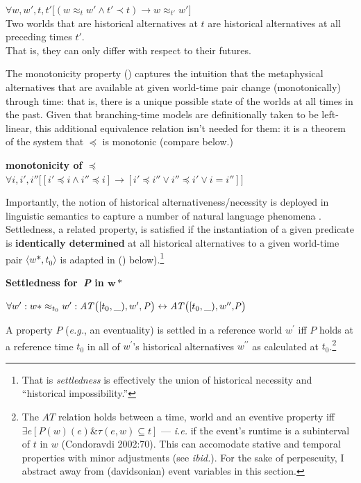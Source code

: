 \documentclass[12pt,dvipsnames]{report}
\begin{document}
	 $ \forall w,w',t,t'\big[(w\approx_t w'\wedge t'\prec t)\to w\approx_{t'} w'\big]$\\
	Two worlds that are historical alternatives at $t$ are historical alternatives at all preceding times $t'$.\\That is, they can only differ with respect to their futures.
	\xe

The monotonicity property () captures the intuition that the metaphysical alternatives that are available at given world-time pair change (monotonically) through time: that is, there is a unique possible state of the worlds at all times in the past.  Given that branching-time models are definitionally taken to be left-linear, this additional equivalence relation isn't needed for them: it is a theorem of the system that $ \preccurlyeq $ is monotonic (compare  below.)

\pex[exno=\getref{histaltdef}]
\a[label=b′] \textbf{monotonicity of $ \boldsymbol\preccurlyeq $}\\$ \forall i,i',i''\big[[i'\preccurlyeq i\wedge i''\preccurlyeq i]\to [i'\preccurlyeq i'' \vee i'' \preccurlyeq i' \vee i=i'']\big] $
\xe


Importantly, the notion of historical alternativeness/necessity is deployed in linguistic semantics to capture a number of natural language phenomena \citep[e.g.,][]{Thomason1984,Condoravdi2002,Kaufmann2002}. Settledness, a related property, is satisfied if the instantiation of a given predicate is \textbf{identically determined} at all historical alternatives to a given world-time pair $\langle w*,t_0\rangle $ is adapted in () below).\footnote{That is \textit{settledness} is effectively the union of historical necessity and ``historical impossibility.''}

\pex \textbf{Settledness for\textbf{\textit{\ P}} in $ \boldsymbol{w*}$}


$\forall w^{\prime}:w*\approx_{t_0}w^{\prime}:\\\mathit{AT}\big([t_0,\_),w^\prime, \mathit P\big)\leftrightarrow \mathit{AT}\big([t_0,\_),w^{\prime\prime},\mathit{\!P}\big)$%


A property $P$ (\textit{e.g.}, an eventuality) is settled in a reference world $w^\prime$ iff $\mathit P$ holds at a reference time $t_0$ in all of $w^\prime$'s historical alternatives $w^{\prime\prime}$ as calculated at $t_0$.\footnote{The $AT$ relation holds between a time, world and an eventive property iff $\exists e[\mathit P(w)(e)\&\tau(e,w)\subseteq t]$ --- \textit{i.e.} if the event's runtime is a subinterval of $t$ in $w$ (Condoravdi 2002:70). This can accomodate stative and temporal properties with minor adjustments (see \textit{ibid.}). For the sake of perpescuity, I abstract away from (davidsonian) event variables in this section.}
\xe
\end{document}
